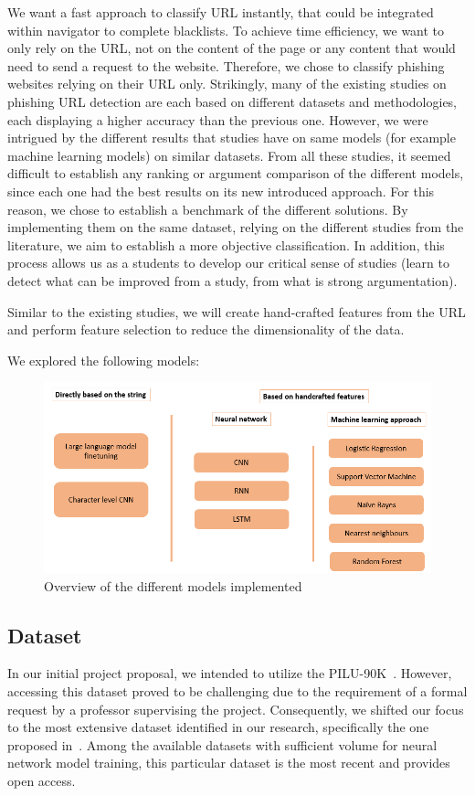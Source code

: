 \documentclass{article}
\begin{document}
    We want a fast approach to classify URL instantly, that could be integrated within navigator to complete blacklists.
    To achieve time efficiency, we want to only rely on the URL, not on the content of the page or any content that would need to send a request to the website.
    Therefore, we chose to classify phishing websites relying on their URL only.
    Strikingly, many of the existing studies on phishing URL detection are each based on different datasets and methodologies, each displaying a higher accuracy than the previous one.
    However, we were intrigued by the different results that studies have on same models (for example machine learning models) on similar datasets.
    From all these studies, it seemed difficult to establish any ranking or argument comparison of the different models, since each one had the best results on its new introduced approach.
    For this reason, we chose to establish a benchmark of the different solutions.
    By implementing them on the same dataset, relying on the different studies from the literature, we aim to establish a more objective classification.
    In addition, this process allows us as a students to develop our critical sense of studies (learn to detect what can be improved from a study, from what is strong argumentation).

    Similar to the existing studies, we will create hand-crafted features from the URL and perform feature selection to reduce the dimensionality of the data.

    We explored the following models:
    \begin{figure}[H]
        \centering
        \includegraphics[width=\linewidth]{report_img/modelspresentation}
        \caption{Overview of the different models implemented}
        \label{fig:model_presentation}
    \end{figure}

    \subsection{Dataset}\label{subsec:dataset}
    In our initial project proposal, we intended to utilize the PILU-90K~\cite{PhishingURLDetection}.
    However, accessing this dataset proved to be challenging due to the requirement of a formal request by a professor supervising the project.
    Consequently, we shifted our focus to the most extensive dataset identified in our research, specifically the one proposed in~\cite{VisualizingRNNInURLDetection}.
    Among the available datasets with sufficient volume for neural network model training, this particular dataset is the most recent and provides open access.
\end{document}
